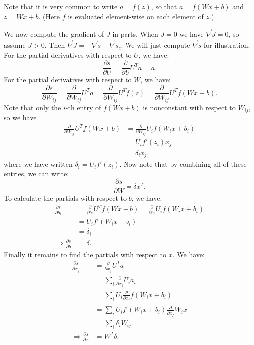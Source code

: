 Note that it is very common to write $a = f(z)$, so that $a = f(Wx + b)$ and $z = Wx + b$. (Here $f$ is evaluated element-wise on each element of $z$.)

We now compute the gradient of $J$ in parts. When $J = 0$ we have $\vec{\nabla} J = 0$, so assume $J > 0$. Then $\vec{\nabla} J = -\vec{\nabla}s + \vec{\nabla}s_c$. We will just compute $\vec{\nabla}s$ for illustration. For the partial derivatives with respect to $U$, we have:
$$\frac{\partial s}{\partial U} = \frac{\partial}{\partial U} U^Ta = a.$$
For the partial derivatives with respect to $W$, we have:
$$\frac{\partial s}{\partial W_{ij}} = \frac{\partial}{\partial W_{ij}} U^Ta = \frac{\partial}{\partial W_{ij}}U^Tf(z) = \frac{\partial}{\partial W_{ij}} U^Tf(Wx + b).$$
Note that only the $i$-th entry of $f(Wx + b)$ is nonconstant with respect to $W_{ij}$, so we have
\begin{align*}
\frac{\partial}{\partial W_{ij}} U^Tf(Wx + b) &= \frac{\partial}{\partial W_{ij}} U_if(W_ix + b_i)\\
&= U_if'(z_i)x_j\\
&= \delta_ix_j,
\end{align*}
where we have written $\delta_i = U_if'(z_i)$. Now note that by combining all of these entries, we can write:
$$\frac{\partial s}{\partial W} = \delta x^T.$$
To calculate the partials with respect to $b$, we have:
\begin{align*}
\frac{\partial s}{\partial b_i} &= \frac{\partial}{\partial b_i}U^Tf(Wx + b) = \frac{\partial}{\partial b_i} U_if(W_ix + b_i)\\
&= U_if'(W_ix + b_i)\\
&= \delta_i\\
\Rightarrow \frac{\partial s}{\partial b} &= \delta.
\end{align*}
Finally it remains to find the partials with respect to $x$. We have:
\begin{align*}
\frac{\partial s}{\partial x_j} &= \frac{\partial}{\partial x_j} U^Ta \\
&= \sum_i \frac{\partial}{\partial x_j} U_ia_i\\
&= \sum_i U_i\frac{\partial}{\partial x_j} f(W_ix + b_i)\\
&= \sum_i U_i f'(W_ix + b_i) \frac{\partial}{\partial x_j} W_ix\\
&= \sum_i \delta_iW_{ij}\\
\Rightarrow \frac{\partial s}{\partial x} &= W^T\delta.
\end{align*}
